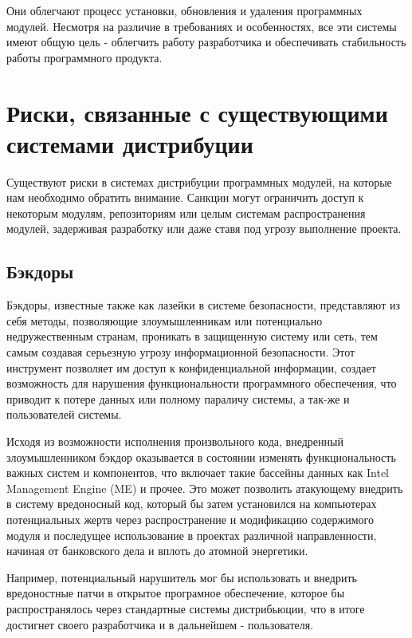 Они облегчают процесс установки, обновления и удаления программных модулей. Несмотря на различие в требованиях и особенностях, все эти системы имеют общую цель - облегчить работу разработчика и обеспечивать стабильность работы программного продукта.

\section{Риски, связанные с существующими системами дистрибуции}

Существуют риски в системах дистрибуции программных модулей, на которые нам необходимо обратить внимание. Санкции могут ограничить доступ к некоторым модулям, репозиториям или целым системам распространения модулей, задерживая разработку или даже ставя под угрозу выполнение проекта.

\subsection{Бэкдоры}


Бэкдоры, известные также как лазейки в системе безопасности, представляют из себя методы, позволяющие злоумышленникам или потенциально недружественным странам, проникать в защищенную систему или сеть, тем самым создавая серьезную угрозу информационной безопасности. Этот инструмент позволяет им доступ к конфиденциальной информации, создает возможность для нарушения функциональности программного обеспечения, что приводит к потере данных или полному параличу системы, а так-же и пользователей системы.

Исходя из возможности исполнения произвольного кода, внедренный злоумышленником бэкдор оказывается в состоянии изменять функциональность важных систем и компонентов, что включает такие бассейны данных как Intel Management Engine (ME) и прочее. Это может позволить атакующему внедрить в систему вредоносный код, который бы затем установился на компьютерах потенциальных жертв через распространение и модификацию содержимого модуля и последущее использование в проектах различной направленности, начиная от банковского дела и вплоть до атомной энергетики. 

Например, потенциальный нарушитель мог бы использовать и внедрить вредоностные патчи в открытое програмное обеспечение, которое бы распространялось через стандартные системы дистрибьюции, что в итоге достигнет своего разработчика и в дальнейшем - пользователя. 

